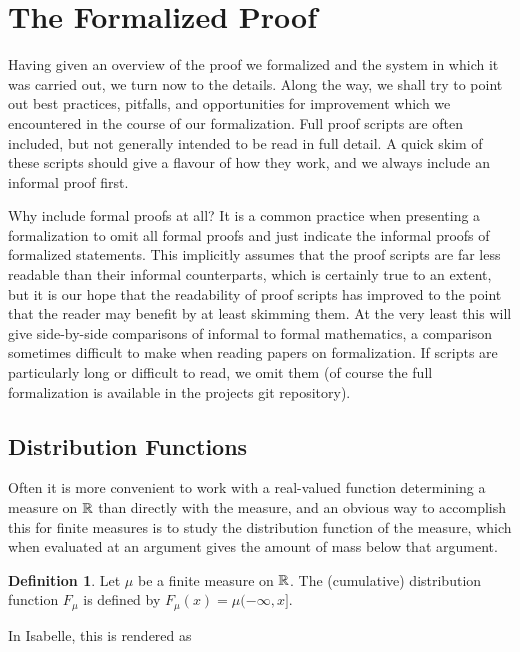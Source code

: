 \documentclass[leqno]{article}
\theoremstyle{definition}
\newtheorem{definition}[theorem]{Definition}
\begin{document}
\section{The Formalized Proof} \label{sec:form}

Having given an overview of the proof we formalized and the system in which it was carried out, we turn now to the details. Along the way, we shall try to point out best practices, pitfalls, and opportunities for improvement which we encountered in the course of our formalization. Full proof scripts are often included, but not generally intended to be read in full detail. A quick skim of these scripts should give a flavour of how they work, and we always include an informal proof first.

Why include formal proofs at all? It is a common practice when presenting a formalization to omit all formal proofs and just indicate the informal proofs of formalized statements. This implicitly assumes that the proof scripts are far less readable than their informal counterparts, which is certainly true to an extent, but it is our hope that the readability of proof scripts has improved to the point that the reader may benefit by at least skimming them. At the very least this will give side-by-side comparisons of informal to formal mathematics, a comparison sometimes difficult to make when reading papers on formalization. If scripts are particularly long or difficult to read, we omit them (of course the full formalization is available in the projects git repository).

\subsection{Distribution Functions} \label{sec:cdf}

Often it is more convenient to work with a real-valued function determining a measure on $\mathbb{R}$ than directly with the measure, and an obvious way to accomplish this for finite measures is to study the distribution function of the measure, which when evaluated at an argument gives the amount of mass below that argument.

\begin{definition}
Let $\mu$ be a finite measure on $\mathbb{R}$. The (cumulative) distribution function $F_\mu$ is defined by $F_\mu(x) = \mu (-\infty, x]$.
\end{definition}

In Isabelle, this is rendered as

\medskip
\end{document}
